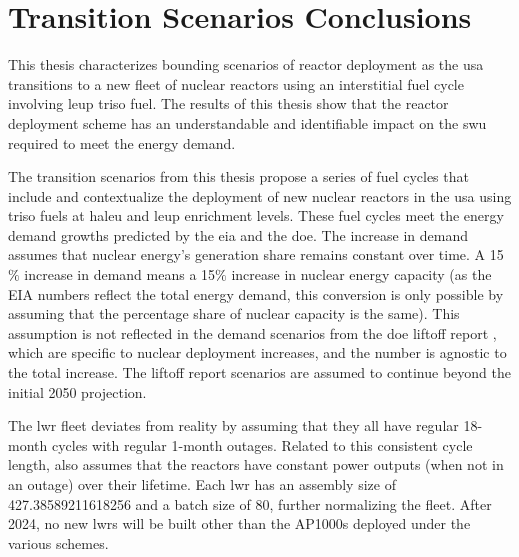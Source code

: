 \section{Transition Scenarios Conclusions}
\label{sec:dep_conc}


This thesis characterizes bounding scenarios of reactor deployment as the \gls{usa} transitions to a new fleet of nuclear reactors using an interstitial fuel cycle involving \gls{leup} \gls{triso} fuel. The results of this thesis show that the reactor deployment scheme has an understandable and identifiable impact on the \gls{swu} required to meet the energy demand.

The transition scenarios from this thesis propose a series of fuel cycles that include and contextualize the deployment of new nuclear reactors in the \gls{usa} using \gls{triso} fuels at \gls{haleu} and \gls{leup} enrichment levels. These fuel cycles meet the energy demand growths predicted by the \gls{eia} and the \gls{doe}. The increase in demand assumes that nuclear energy's generation share remains constant over time. A 15$\%$ increase in demand means a 15$\%$ increase in nuclear energy capacity (as the EIA numbers \cite{eia_aeo_2023} reflect the total energy demand, this conversion is only possible by assuming that the percentage share of nuclear capacity is the same). This assumption is not reflected in the demand scenarios from the \gls{doe} liftoff report \cite{julie_liftoff_pathways_2024}, which are specific to nuclear deployment increases, and the number is agnostic to the total increase. The liftoff report scenarios are assumed to continue beyond the initial 2050 projection.

The \gls{lwr} fleet deviates from reality by assuming that they all have regular 18-month cycles with regular 1-month outages. Related to this consistent cycle length, \cyclus also assumes that the reactors have constant power outputs (when not in an outage) over their lifetime. Each \gls{lwr} has an assembly size of 427.38589211618256 and a batch size of 80, further normalizing the fleet. After 2024, no new \glspl{lwr} will be built other than the AP1000s deployed under the various schemes.

